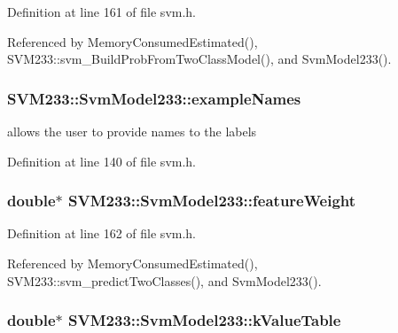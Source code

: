 Definition at line 161 of file svm.\+h.



Referenced by Memory\+Consumed\+Estimated(), S\+V\+M233\+::svm\+\_\+\+Build\+Prob\+From\+Two\+Class\+Model(), and Svm\+Model233().

\subsubsection[{\texorpdfstring{example\+Names}{exampleNames}}]{ S\+V\+M233\+::\+Svm\+Model233\+::example\+Names}\hypertarget{struct_s_v_m233_1_1_svm_model233_afa332c55cdafdab8746f38c85fb22741}{}\label{struct_s_v_m233_1_1_svm_model233_afa332c55cdafdab8746f38c85fb22741}
allows the user to provide names to the labels 

Definition at line 140 of file svm.\+h.

\subsubsection[{\texorpdfstring{feature\+Weight}{featureWeight}}]{\setlength{\rightskip}{0pt plus 5cm}double$\ast$ S\+V\+M233\+::\+Svm\+Model233\+::feature\+Weight}\hypertarget{struct_s_v_m233_1_1_svm_model233_a2b8ac0c5640a5a57b77561122c2f0fea}{}\label{struct_s_v_m233_1_1_svm_model233_a2b8ac0c5640a5a57b77561122c2f0fea}


Definition at line 162 of file svm.\+h.



Referenced by Memory\+Consumed\+Estimated(), S\+V\+M233\+::svm\+\_\+predict\+Two\+Classes(), and Svm\+Model233().

\subsubsection[{\texorpdfstring{k\+Value\+Table}{kValueTable}}]{\setlength{\rightskip}{0pt plus 5cm}double$\ast$ S\+V\+M233\+::\+Svm\+Model233\+::k\+Value\+Table}\hypertarget{struct_s_v_m233_1_1_svm_model233_a2ab40b5375c760b5a71fa646f1390040}{}\label{struct_s_v_m233_1_1_svm_model233_a2ab40b5375c760b5a71fa646f1390040}


